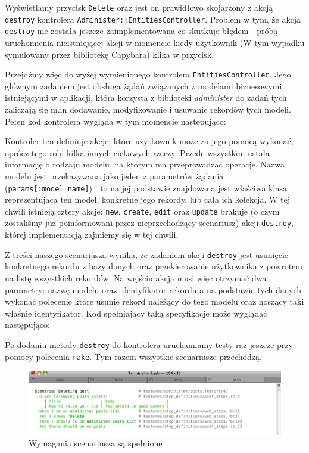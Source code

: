   Wyświetlamy przycisk \texttt{Delete} oraz jest on prawidłowo skojarzony z akcją \texttt{destroy} kontrolera \texttt{Administer::EntitiesController}. Problem w tym, że akcja \texttt{destroy} nie została jeszcze zaimplementowana co skutkuje błędem - próbą uruchomienia nieistniejącej akcji w momencie kiedy użytkownik (W tym wypadku symulowany przez bibliotekę Capybara) klika w przycisk.
  
  Przejdźmy więc do wyżej wymienionego kontrolera \texttt{EntitiesController}. Jego głównym zadaniem jest obsługa żądań związanych z modelami biznesowymi istniejącymi w aplikacji, która korzysta z biblioteki \emph{administer} do zadań tych zaliczają się m.in dodawanie, modyfikowanie i usuwanie rekordów tych modeli. Pełen kod kontrolera wygląda w tym momencie następująco:
  
  
  
  Kontroler ten definiuje akcje, które użytkownik może za jego pomocą wykonać, oprócz tego robi kilka innych ciekawych rzeczy. Przede wszystkim ustala informację o rodzaju modelu, na którym ma przeprowadzać operacje. Nazwa modelu jest przekazywana jako jeden z parametrów żądania (\verb+params[:model_name]+) i to na jej podstawie znajdowana jest właściwa klasa reprezentująca ten model, konkretne jego rekordy, lub cała ich kolekcja.
  W tej chwili istnieją cztery akcje: \texttt{new}, \texttt{create}, \texttt{edit} oraz \texttt{update} brakuje (o czym zostaliśmy już poinformowani przez nieprzechodzący scenariusz) akcji \texttt{destroy}, której implementacją zajmiemy się w tej chwili.
  
  Z treści naszego scenariusza wynika, że zadaniem akcji \texttt{destroy} jest usunięcie konkretnego rekordu z bazy danych oraz przekierowanie użytkownika z powrotem na listę wszystkich rekordów. Na wejściu akcja musi więc otrzymać dwa parametry: nazwę modelu oraz identyfikator rekordu a na podstawie tych danych wykonać polecenie które usunie rekord należący do tego modelu oraz noszący taki właśnie identyfikator. Kod spełniający taką specyfikacje może wyglądać następująco: 
  
  
  
  Po dodaniu metody \texttt{destroy} do kontrolera uruchamiamy testy raz jeszcze przy pomocy polecenia \texttt{rake}. Tym razem wszystkie scenariusze przechodzą.
  
  \clearpage
  
   \begin{figure}[!h]
 		\begin{center}
 			\includegraphics[width=\linewidth]{images/delete_record_scenario_pass.png}
 			\caption{Wymagania scenariusza są spełnione}
 			\label{delete_record_scenario_pass}
 		\end{center}
 	\end{figure}
 	
